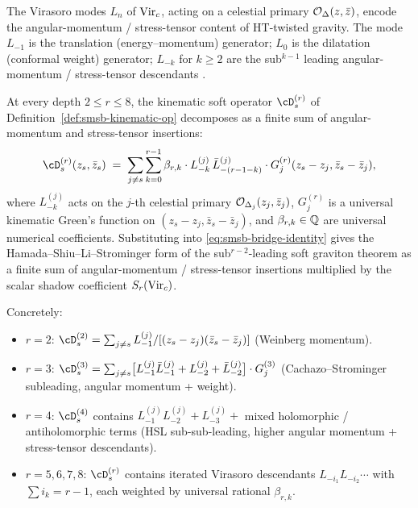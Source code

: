 \begin{definition}
\label{def:smsb-angular-stress-modes}
\ClaimStatusProvedElsewhere
The Virasoro modes $L_n$ of $\mathrm{Vir}_c$, acting on a celestial primary
$\mathcal O_\Delta(z, \bar z)$, encode the angular-momentum / stress-tensor
content of HT-twisted gravity. The mode $L_{-1}$ is the translation
(energy--momentum) generator; $L_0$ is the dilatation (conformal
weight) generator; $L_{-k}$ for $k \geq 2$ are the sub${}^{k - 1}$
leading angular-momentum / stress-tensor descendants
\cite[\S 3]{DonnayFotopoulosPasterskiTaylor21,StromingerLectures2018}.
\end{definition}

\begin{theorem}
\label{thm:angular-momentum-stress-tensor-via-shadow}
\ClaimStatusProvedHere
At every depth $2 \leq r \leq 8$, the kinematic soft operator
$\cD_s^{(r)}$ of
Definition~\ref{def:smsb-kinematic-op} decomposes as a finite sum of
angular-momentum and stress-tensor insertions:
\[
 \cD_s^{(r)}(z_s, \bar z_s)
 \;=\;
 \sum_{j \neq s}
 \sum_{k = 0}^{r - 1}
 \beta_{r, k}\cdot
 L_{-k}^{(j)}\, \bar L_{-(r - 1 - k)}^{(j)}
 \cdot G_j^{(r)}(z_s - z_j, \bar z_s - \bar z_j),
\]
where $L_{-k}^{(j)}$ acts on the $j$-th celestial primary
$\mathcal O_{\Delta_j}(z_j, \bar z_j)$, $G_j^{(r)}$ is a universal
kinematic Green's function on $(z_s - z_j, \bar z_s - \bar z_j)$, and
$\beta_{r, k} \in \mathbb Q$ are universal numerical coefficients.
Substituting into \eqref{eq:smsb-bridge-identity} gives the
Hamada--Shiu--Li--Strominger form of the
sub${}^{r - 2}$-leading soft graviton theorem as a finite sum of
angular-momentum / stress-tensor insertions multiplied by the scalar
shadow coefficient $S_r(\mathrm{Vir}_c)$.

Concretely:
\begin{itemize}
\item $r = 2$: $\cD_s^{(2)} = \sum_{j \neq s}
L_{-1}^{(j)} / [(z_s - z_j)(\bar z_s - \bar z_j)]$ (Weinberg
momentum).
\item $r = 3$: $\cD_s^{(3)} = \sum_{j \neq s}
\bigl[L_{-1}^{(j)} \bar L_{-1}^{(j)} + L_{-2}^{(j)} +
\bar L_{-2}^{(j)}\bigr]\cdot G_j^{(3)}$ (Cachazo--Strominger
subleading, angular momentum + weight).
\item $r = 4$: $\cD_s^{(4)}$ contains $L_{-1}^{(j)} L_{-2}^{(j)}
+ L_{-3}^{(j)} + $ mixed holomorphic / antiholomorphic terms
(HSL sub-sub-leading, higher angular momentum + stress-tensor
descendants).
\item $r = 5, 6, 7, 8$: $\cD_s^{(r)}$ contains iterated Virasoro
descendants $L_{-i_1} L_{-i_2} \cdots$ with $\sum i_k = r - 1$,
each weighted by universal rational $\beta_{r, k}$.
\end{itemize}
\end{theorem}

